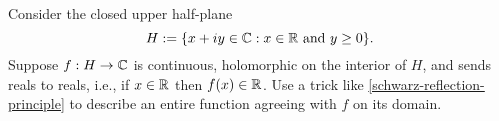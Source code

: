 \documentclass{homework}
\begin{document}
                                                                                                                                                                                                                                                                              \begin{problem}\label{schwarz-reflection-principle-2}Consider the
                                                                                                                                                                                                                                                                                closed upper half-plane
                                                                                                                                                                                                                                                                                  \[
                                                                                                                                                                                                                                                                                      H := \{ x + iy \in \mathbb{C} : x \in \mathbb{R} \mbox{ and } y \geq 0 \}.
                                                                                                                                                                                                                                                                                        \]
                                                                                                                                                                                                                                                                                          Suppose $f : H \to \mathbb{C}$ is continuous, holomorphic on the interior of
                                                                                                                                                                                                                                                                                            $H$, and sends reals to reals, i.e., if $x \in \mathbb{R}$ then
                                                                                                                                                                                                                                                                                              $f(x) \in \mathbb{R}$.  Use a trick like \ref{schwarz-reflection-principle}
                                                                                                                                                                                                                                                                                                to describe an entire function agreeing with $f$ on its domain.
                                                                                                                                                                                                                                                                                                \end{problem}
\end{document}
